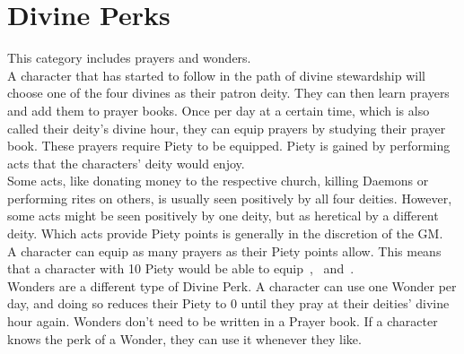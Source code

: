 \chapter{Divine Perks}\label{divinePerks}
This category includes prayers and wonders.\\
A character that has started to follow in the path of divine stewardship will choose one of the four divines as their patron deity.
They can then learn prayers and add them to prayer books.
Once per day at a certain time, which is also called their deity's divine hour, they can equip prayers by studying their prayer book.
These prayers require Piety to be equipped.
Piety is gained by performing acts that the characters' deity would enjoy.\\
Some acts, like donating money to the respective church, killing Daemons or performing rites on others, is usually seen positively by all four deities.
However, some acts might be seen positively by one deity, but as heretical by a different deity.
Which acts provide Piety points is generally in the discretion of the GM.\\
A character can equip as many prayers as their Piety points allow.
This means that a character with 10 Piety would be able to equip~,~ and~.\\
Wonders are a different type of Divine Perk.
A character can use one Wonder per day, and doing so reduces their Piety to 0 until they pray at their deities' divine hour again.
Wonders don't need to be written in a Prayer book.
If a character knows the perk of a Wonder, they can use it whenever they like.\\


	
	
	
	
	
	
	

	

	
	
	
	
	
	
	
	
	
	
	
	
	
	
	
